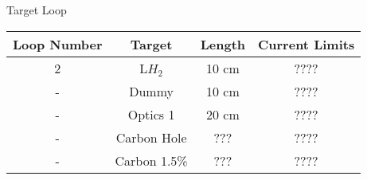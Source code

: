 \begin{Mtable}{Target Loop}
  \centering
  \begin{tabular}{|c|c|c|c|}
    \hline
    \textbf{Loop Number} & \textbf{Target} & \textbf{Length} & \textbf{Current Limits} \\
    \hline
    2 & L$H_2$ & 10 cm & ???? \\
    - & Dummy & 10 cm  & ???? \\
    - & Optics 1 & 20 cm  & ???? \\
    - & Carbon Hole & ???  & ???? \\
    - & Carbon 1.5\% & ???  & ???? \\
    \hline
    \end{tabular}
  \caption{Break down of all targets available during the running period. The three cryogenic targets are labeled alongside their corresponding loops. The target length is also provided for each type.}
  \label{tab:2-3_target_loop}
\end{Mtable}

